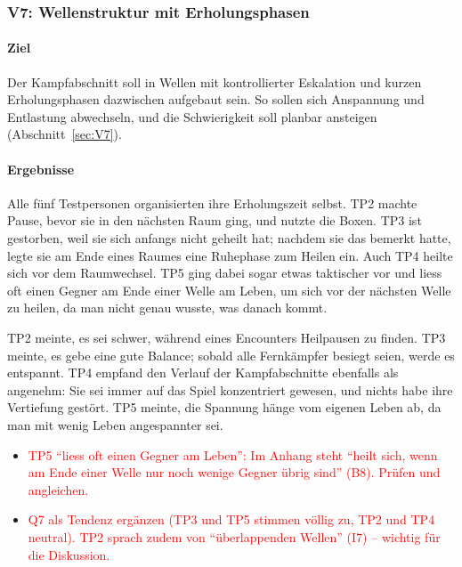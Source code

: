 \documentclass[../Main.tex]{subfiles}
\begin{document}
\subsubsection{V7: Wellenstruktur mit Erholungsphasen}

\paragraph{Ziel}
Der Kampfabschnitt soll in Wellen mit kontrollierter Eskalation und kurzen Erholungsphasen dazwischen aufgebaut sein. So sollen sich Anspannung und Entlastung abwechseln, und die Schwierigkeit soll planbar ansteigen (Abschnitt~\ref{sec:V7}).

\paragraph{Ergebnisse}
Alle fünf Testpersonen organisierten ihre Erholungszeit selbst. TP2 machte Pause, bevor sie in den nächsten Raum ging, und nutzte die Boxen. TP3 ist gestorben, weil sie sich anfangs nicht geheilt hat; nachdem sie das bemerkt hatte, legte sie am Ende eines Raumes eine Ruhephase zum Heilen ein. Auch TP4 heilte sich vor dem Raumwechsel. TP5 ging dabei sogar etwas taktischer vor und liess oft einen Gegner am Ende einer Welle am Leben, um sich vor der nächsten Welle zu heilen, da man nicht genau wusste, was danach kommt.

TP2 meinte, es sei schwer, während eines Encounters Heilpausen zu finden. TP3 meinte, es gebe eine gute Balance; sobald alle Fernkämpfer besiegt seien, werde es entspannt. TP4 empfand den Verlauf der Kampfabschnitte ebenfalls als angenehm: Sie sei immer auf das Spiel konzentriert gewesen, und nichts habe ihre Vertiefung gestört. TP5 meinte, die Spannung hänge vom eigenen Leben ab, da man mit wenig Leben angespannter sei.

\begin{itemize}[leftmargin=1.5cm]
    \item \textcolor{red}{TP5 \enquote{liess oft einen Gegner am Leben}: Im Anhang steht \enquote{heilt sich, wenn am Ende einer Welle nur noch wenige Gegner übrig sind} (B8). Prüfen und angleichen.}
    \item \textcolor{red}{Q7 als Tendenz ergänzen (TP3 und TP5 stimmen völlig zu, TP2 und TP4 neutral). TP2 sprach zudem von \enquote{überlappenden Wellen} (I7) -- wichtig für die Diskussion.}
\end{itemize}
\end{document}

